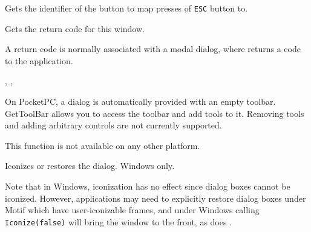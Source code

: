 
Gets the identifier of the button to map presses of \texttt{\textsc{ESC}}
button to.




\label{wxdialoggetreturncode}


Gets the return code for this window.


A return code is normally associated with a modal dialog, where  returns
a code to the application.


, ,\rtfsp
{}


\label{wxdialoggettoolbar}


On PocketPC, a dialog is automatically provided with an empty toolbar. GetToolBar
allows you to access the toolbar and add tools to it. Removing tools and adding
arbitrary controls are not currently supported.

This function is not available on any other platform.


\label{wxdialogiconized}


Iconizes or restores the dialog. Windows only.




Note that in Windows, iconization has no effect since dialog boxes cannot be
iconized. However, applications may need to explicitly restore dialog
boxes under Motif which have user-iconizable frames, and under Windows
calling {\tt Iconize(false)} will bring the window to the front, as does
.


\label{wxdialogisiconized}

